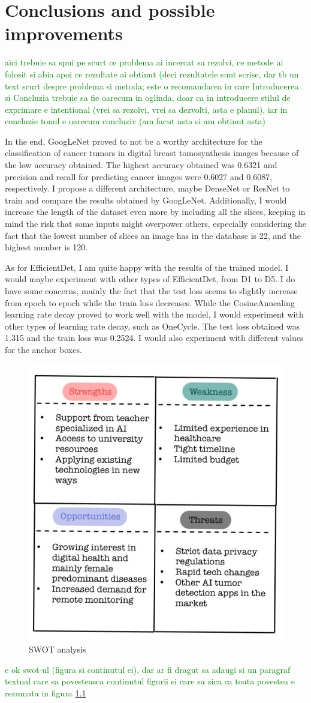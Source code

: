 \chapter{Conclusions and possible improvements}
\label{chap:ch6}


\textcolor{green}{aici trebuie sa spui pe scurt ce problema ai incercat sa rezolvi, ce metode ai folosit si abia  apoi ce rezultate ai obtinut (deci rezultatele sunt scrise, dar tb un text scurt despre problema si metoda; este o recomandarea in care Introducerea si Concluzia trebuie sa fie oarecum in oglinda, doar ca in introducere stilul de exprimare e intentional (vrei sa rezolvi, vrei sa dezvolti, asta e planul), iar in concluzie tonul e oarecum concluziv (am facut asta si am obtinut asta)}

In the end, GoogLeNet proved to not be a worthy architecture for the classification of cancer tumors in digital breast tomosynthesis images because of the low accuracy obtained. The highest accuracy obtained was 0.6321 and precision and recall for predicting cancer images were 0.6027 and 0.6087, respectively. I propose a different architecture, maybe DenseNet or ResNet to train and compare the results obtained by GoogLeNet. Additionally, I would increase the length of the dataset even more by including all the slices, keeping in mind the risk that some inputs might overpower others, especially considering the fact that the lowest number of slices an image has in the database is 22, and the highest number is 120.

As for EfficientDet, I am quite happy with the results of the trained model. I would maybe experiment with other types of EfficientDet, from D1 to D5. I do have some concerns, mainly the fact that the test loss seems to slightly increase from epoch to epoch while the train loss decreases. While the CosineAnnealing learning rate decay proved to work well with the model, I would experiment with other types of learning rate decay, such as OneCycle. The test loss obtained was 1.315 and the train loss was 0.2524. I would also experiment with different values for the anchor boxes.

\begin{figure}
    \centering
    \includegraphics[width=0.5\linewidth]{figures/Figure54.png}
    \caption{SWOT analysis}
    \label{fig:fig44}
\end{figure}

\textcolor{green}{e ok swot-ul (figura si continutul ei), dar ar fi dragut sa adaugi si un paragraf textual care sa povesteasca continutul figurii si care sa zica ca toata povestea e rezumata in figura \ref{fig:fig44}}
